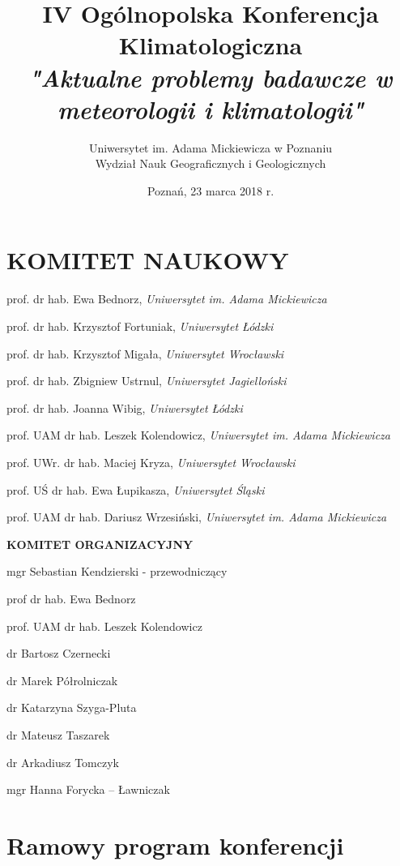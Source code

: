\documentclass[12pt,oneside]{book}
\title{IV Ogólnopolska Konferencja Klimatologiczna \\ \emph{"Aktualne problemy badawcze w meteorologii i klimatologii"}}
\date{Poznań, 23 marca 2018 r.}
\author{Uniwersytet im. Adama Mickiewicza w Poznaniu\\Wydział Nauk Geograficznych i Geologicznych}
\begin{document}
% 

\frontmatter
\maketitle

\chapter*{KOMITET NAUKOWY}
\vspace{-0.5cm}

prof. dr hab. Ewa Bednorz, \textit{Uniwersytet im. Adama Mickiewicza}

prof. dr hab. Krzysztof Fortuniak,  \textit{Uniwersytet Łódzki}

prof. dr hab. Krzysztof Migała,  \textit{Uniwersytet Wrocławski}

prof. dr hab. Zbigniew Ustrnul,  \textit{Uniwersytet Jagielloński}

prof. dr hab. Joanna Wibig, \textit{Uniwersytet Łódzki}

prof. UAM dr hab. Leszek Kolendowicz, \textit{Uniwersytet im. Adama Mickiewicza}

prof. UWr. dr hab. Maciej Kryza, \textit{Uniwersytet Wrocławski}

prof. UŚ dr hab. Ewa Łupikasza,  \textit{Uniwersytet Śląski}

prof. UAM dr hab. Dariusz Wrzesiński, \textit{Uniwersytet im. Adama Mickiewicza}


\vspace{2cm}
\Large{\textbf{KOMITET ORGANIZACYJNY}}
\vspace{0.5cm}

\normalsize 

mgr Sebastian Kendzierski - przewodniczący

prof dr hab. Ewa Bednorz

prof. UAM dr hab. Leszek Kolendowicz

dr Bartosz Czernecki

dr Marek Półrolniczak

dr Katarzyna Szyga-Pluta

dr Mateusz Taszarek

dr Arkadiusz Tomczyk

mgr Hanna Forycka -- Ławniczak


\chapter{Ramowy program konferencji }
\end{document}
